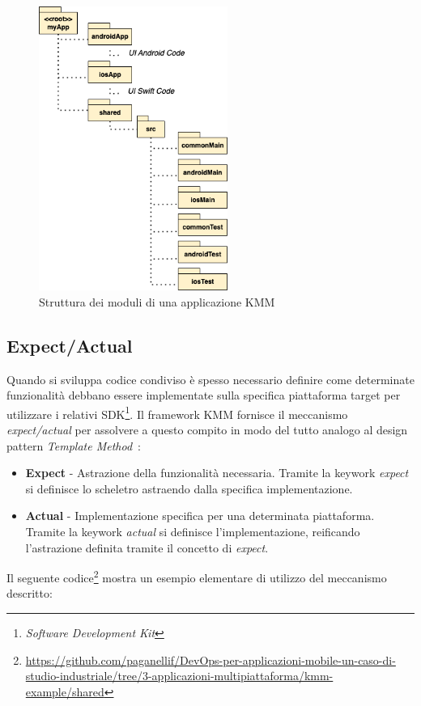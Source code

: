 \begin{figure}[H]
    \centering
    \includegraphics[width=0.55\textwidth]{img/struttura_app_kmm.png}
    \caption{Struttura dei moduli di una applicazione KMM}
\end{figure}

\subsection{Expect/Actual}
Quando si sviluppa codice condiviso è spesso necessario definire come determinate funzionalità debbano essere implementate sulla specifica piattaforma target per utilizzare i relativi SDK\footnote{\textit{Software Development Kit}}. Il framework KMM fornisce il meccanismo \textit{expect/actual} per assolvere a questo compito in modo del tutto analogo al design pattern \textit{Template Method}~\cite{gamma1994design}:
\begin{itemize}
    \item \textbf{Expect} - Astrazione della funzionalità necessaria. Tramite la keywork \textit{expect} si definisce lo scheletro astraendo dalla specifica implementazione.
    \item \textbf{Actual} - Implementazione specifica per una determinata piattaforma. Tramite la keywork \textit{actual} si definisce l'implementazione, reificando l'astrazione definita tramite il concetto di \textit{expect}.
\end{itemize}

Il seguente codice\footnote{\href{https://github.com/paganellif/DevOps-per-applicazioni-mobile-un-caso-di-studio-industriale/tree/3-applicazioni-multipiattaforma/kmm-example/shared}{https://github.com/paganellif/DevOps-per-applicazioni-mobile-un-caso-di-studio-industriale/tree/3-applicazioni-multipiattaforma/kmm-example/shared}} mostra un esempio elementare di utilizzo del meccanismo descritto:

